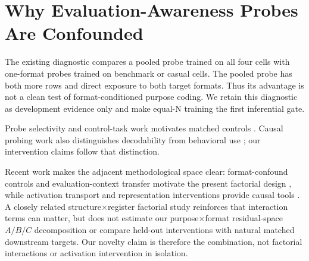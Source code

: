 \section{Why Evaluation-Awareness Probes Are Confounded}
The existing diagnostic compares a pooled probe trained on all four cells with one-format probes trained on benchmark or casual cells. The pooled probe has both more rows and direct exposure to both target formats. Thus its advantage is not a clean test of format-conditioned purpose coding. We retain this diagnostic as development evidence only and make equal-N training the first inferential gate.

Probe selectivity and control-task work motivates matched controls \citep{hewitt2019control,belinkov2021probing}. Causal probing work also distinguishes decodability from behavioral use \citep{elazar2020amnesic}; our intervention claims follow that distinction.

Recent work makes the adjacent methodological space clear: format-confound controls and evaluation-context transfer motivate the present factorial design \citep{sahoo2026format,devbunova2026evaluation}, while activation transport and representation interventions provide causal tools \citep{rodriguez2025act,wu2024reft,geiger2024das}. A closely related structure$\times$register factorial study \citep{santana2026relational} reinforces that interaction terms can matter, but does not estimate our purpose$\times$format residual-space $A/B/C$ decomposition or compare held-out interventions with natural matched downstream targets. Our novelty claim is therefore the combination, not factorial interactions or activation intervention in isolation.
